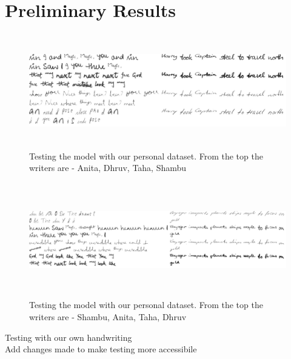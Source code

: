 \documentclass[10pt,twocolumn,letterpaper]{article}
\begin{document}
\section{Preliminary Results}
\begin{figure}
  \centering
  \includegraphics[width=500pt,height=141pt]{../latex-src/Images/Our_HWT1.jpeg} 
  \caption{Testing the model with our personal dataset. From the top the writers are - Anita, Dhruv, Taha, Shambu}
\end{figure}
\begin{figure}
  \centering
  \includegraphics[width=500pt,height=141pt]{../latex-src/Images/Our_HWT2.jpg} 
  \caption{Testing the model with our personal dataset. From the top the writers are - Shambu, Anita, Taha, Dhruv}
\end{figure}
Testing with our own handwriting \\
Add changes made to make testing more accessibile 
{\small


}
\end{document}
